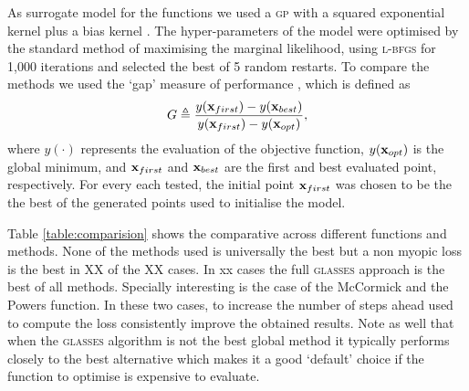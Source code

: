 \documentclass[twoside]{article}
\newcommand{\acr}[1]{\textsc{#1}\xspace}
\newcommand{\gp}{\acr{gp}}
\newcommand{\us}{\acr{glasses}}
\newcommand{\lbfgs}{\acr{l-bfgs}}
\begin{document}
As surrogate model for the functions we used a \gp with a squared exponential kernel plus a bias kernel \citep{Rasmussen:2005:GPM:1162254}. The hyper-parameters of the model were optimised by the standard method of maximising the marginal likelihood, using \lbfgs \citep{Nocedal1980} for 1,000 iterations and selected the best of 5 random restarts.
To compare the methods we used the `gap' measure of performance \citep{Huang:2006}, which is defined as
\begin{equation}\nonumber
G \triangleq \frac{y(\mathbf{x}_{first})-y(\mathbf{x}_{best})}{y(\mathbf{x}_{first})-y(\mathbf{x}_{opt})} ,
\end{equation}
where $y(\cdot)$ represents the evaluation of the objective function, $y(\mathbf{x}_{opt})$ is the global minimum, and $\mathbf{x}_{first}$ and $\mathbf{x}_{best}$ are the first and best evaluated point, respectively. For every each tested, the initial point $\mathbf{x}_{first}$ was chosen to be the the best of the generated points used to initialise the model. 

Table \ref{table:comparision} shows the comparative across different functions and methods. None of the methods used is universally the best but a non myopic loss is the best in XX of the XX cases. In xx cases the full \us approach is the best of all methods. Specially interesting is the case of the McCormick and the Powers function. In these two cases, to increase the number of steps ahead used to compute the loss consistently improve the obtained results. Note as well that when the \us algorithm is not the best global method it typically performs closely to the best alternative which makes it a good `default' choice if the function to optimise is expensive to evaluate.






\end{document}
